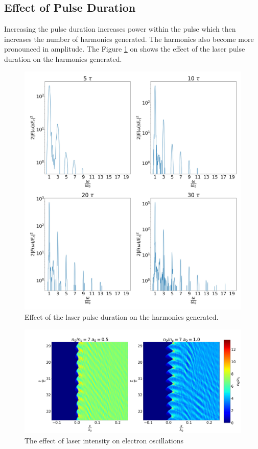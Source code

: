 \documentclass[12pt]{article}
\newenvironment{changemargin}[2]{
\begin{list}{}{
\setlength{\topsep}{0pt}
\setlength{\leftmargin}{#1}
\setlength{\rightmargin}{#2}
\setlength{\listparindent}{\parindent}
\setlength{\itemindent}{\parindent}
\setlength{\parsep}{\parskip}
}
\item[]}{\end{list}}
\begin{document}
\begin{changemargin}{-2cm}{-2cm}
    \subsection{Effect of Pulse Duration}
    Increasing the pulse duration increases power within the pulse which then increases the number of harmonics generated. The harmonics also become more pronounced in amplitude. The Figure \ref{fig:pulse} on shows the effect of the laser pulse duration on the harmonics generated.
    \begin{figure}[t]
        \centering
        \includegraphics[width=1.0\textwidth, height=0.8\textwidth]{images/pulse.jpg}
        \caption{Effect of the laser pulse duration on the harmonics generated.}
        \label{fig:pulse}
    \end{figure}
    \begin{figure}[h]
        \centering
        \includegraphics[width=1.0\textwidth, height=0.8\textwidth]{images/oscillation1.jpg}
        \caption{The effect of laser intensity on electron oscillations}
        \label{fig:oscillation1}
    \end{figure}

\end{changemargin}
\end{document}
